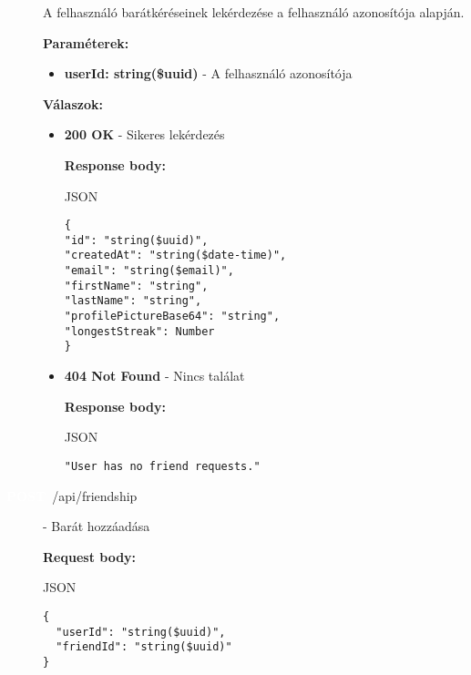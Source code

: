 \documentclass[12pt]{report}
\newcommand{\httpPost}[1]{\colorbox{postColor}{\textbf{\textcolor{white}{POST}}}~#1}
\begin{document}
\begin{description}
    \vspace{0.5cm}
    \begin{sloppypar}
      A felhasználó barátkéréseinek lekérdezése a felhasználó azonosítója alapján.
    \end{sloppypar}

    \vspace{0.5cm}
    \textbf{Paraméterek:}
    \begin{itemize}
      \item \textbf{userId: string(\$uuid)} - A felhasználó azonosítója
    \end{itemize}

    \vspace{0.5cm}
    \textbf{Válaszok:}
    \begin{itemize}
      \item \textbf{200 OK} - Sikeres lekérdezés

        \textbf{Response body:}
        \begin{codeblock}{JSON}
          \begin{verbatim}
{
"id": "string($uuid)",
"createdAt": "string($date-time)",
"email": "string($email)",
"firstName": "string",
"lastName": "string",
"profilePictureBase64": "string",
"longestStreak": Number
}
          \end{verbatim}
        \end{codeblock}

      \item \textbf{404 Not Found} - Nincs találat

        \textbf{Response body:}
        \begin{codeblock}{JSON}
          \begin{verbatim}
"User has no friend requests."
          \end{verbatim}
        \end{codeblock}
    \end{itemize}

  \item[\httpPost{/api/friendship}] - Barát hozzáadása
  
    \vspace{0.5cm}
    \textbf{Request body:}
    \begin{codeblock}{JSON}
      \begin{verbatim}
{
  "userId": "string($uuid)",
  "friendId": "string($uuid)"
}
      \end{verbatim}
    \end{codeblock}


\end{description}
\end{document}
